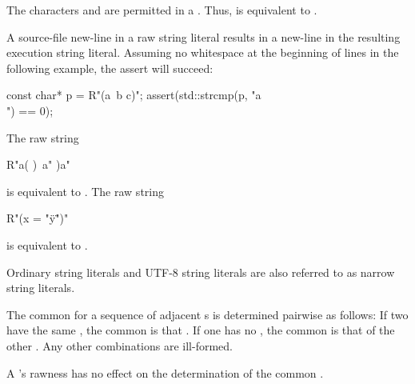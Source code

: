 \documentclass{wg21}
\begin{document}
\pnum
\begin{note}
    The characters  and  are permitted in a
    . Thus,  is equivalent to
    .
\end{note}

\pnum
\begin{note}
    A source-file new-line in a raw string literal results in a new-line in the
    resulting execution string literal. Assuming no
    whitespace at the beginning of lines in the following example, the assert will succeed:
    \begin{codeblock}
        const char* p = R"(a\
        b
        c)";
        assert(std::strcmp(p, "a\\\nb\nc") == 0);
    \end{codeblock}
\end{note}

\pnum
\begin{example}
    The raw string
    \begin{codeblock}
        R"a(
        )\
        a"
        )a"
    \end{codeblock}
    is equivalent to . The raw string
    \begin{codeblock}
        R"(x = "\"y\"")"
    \end{codeblock}
    is equivalent to .
\end{example}

\pnum
{}%
%
Ordinary string literals and UTF-8 string literals are
also referred to as narrow string literals.

\pnum
{}%
The common 
for a sequence of adjacent s
is determined pairwise as follows:
If two {s} have
the same ,
the common  is that .
If one  has no \grammarterm{encoding-prefix},
the common \grammarterm{encoding-prefix} is that
of the other .
Any other combinations are ill-formed.
\begin{note}
    A \grammarterm{string-literal}'s rawness has
    no effect on the determination of the common .
\end{note}
\end{document}
